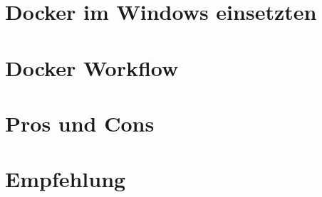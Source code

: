 \documentclass[
10pt, %
a4paper, %
BCOR15mm, %
DIV14, %
footsepline = false, %
headsepline, %
oneside,
openright,
parskip=half, %
abstracton, %
listof=totocnumbered, %
bibliography=totocnumbered %
]{scrreprt}
\begin{document}


\cleardoublepage


\chapter{Docker im Windows einsetzten}\label{chapter:Docker im Windows einsetzten}



\cleardoublepage

  
\chapter{Docker Workflow}\label{chapter:DockerWorkflow}
  


\cleardoublepage


\chapter{Pros und Cons}\label{chapter:ProsUndCons}



\cleardoublepage


\chapter{Empfehlung}\label{chapter:Empfehlung}



\cleardoublepage
\end{document}
